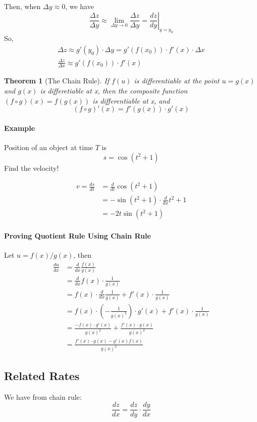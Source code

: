\documentclass[12pt]{article}
\newtheorem{theorem}{Theorem}
\begin{document}
Then, when $\Delta y \approx 0 $, we have
\[
    \frac{\Delta z}{\Delta y} \approx \lim_{\Delta y \to 0} \frac{\Delta z}{\Delta y} = \left. \frac{dz}{dy} \right|_{y = y_0}
\]
So, 
\begin{align*} 
    \Delta z \approx g'(y_0) \cdot \Delta y = g'(f(x_0)) \cdot f'(x) \cdot \Delta x \\
    \frac{\Delta z}{\Delta x} \approx g'(f(x_0)) \cdot f'(x)
\end{align*}

\begin{theorem}[The Chain Rule]
    If $f(u)$ is differentiable at the point $u = g(x)$ and $g(x)$ is differetiable at x, then
    the composite function $(f \circ g)(x) = f(g(x))$ is differentiable at x, and
    \[
        (f \circ g)'(x) = f'(g(x)) \cdot g'(x)
    \]
\end{theorem}

\paragraph{Example} Position of an object at time $T$ is
\[
    s = \cos (t^2 + 1)
\]
Find the velocity!

\begin{align*} 
    v = \frac{ds}{dt} &= \frac{d}{dt} \cos (t^2 + 1) \\
    &= - \sin (t^2 + 1) \cdot \frac{d}{dx} t^2 + 1 \\
    &= - 2t \sin (t^2 + 1)
\end{align*}
\paragraph{Proving Quotient Rule Using Chain Rule} Let $ u = f(x)/g(x)$, then
\begin{align*} 
     \frac{du}{dx} &= \frac{d}{dx} \frac{f(x)}{g(x)}\\
     &= \frac{d}{dx} f(x) \cdot \frac{1}{g(x)} \\ 
     &= f(x) \cdot \frac{d}{dx} \frac{1}{g(x)} + f'(x) \cdot \frac{1}{g(x)} \\
     &= f(x) \cdot \left( - \frac{1}{g(x)^2} \right) \cdot g'(x) + f'(x) \cdot \frac{1}{g(x)} \\
     &= \frac{ - f(x) \cdot g'(x)}{g(x)^2} + \frac{f'(x) \cdot g(x)}{g(x)^2} \\
     &= \frac{f'(x) \cdot g(x) - g'(x)f(x)}{g(x)^2}
\end{align*}

\subsection{Related Rates}
We have from chain rule:
\[
    \frac{dz}{dx} = \frac{dz}{dy} \cdot \frac{dy}{dx} 
\]
\end{document}
